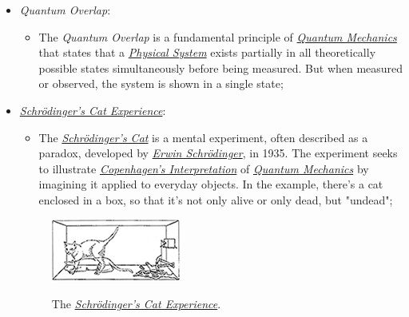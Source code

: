 \documentclass[conference]{IEEEtran}
\begin{document}
\begin{itemize}
  \item \textit{Quantum Overlap}:
    \begin{itemize}
        \item The \textit{Quantum Overlap} is a fundamental principle of \href{https://en.wikipedia.org/wiki/Quantum_mechanics}{\textit{Quantum Mechanics}} that states that a \href{https://en.wikipedia.org/wiki/Physical_system}{\textit{Physical System}} exists partially in all theoretically possible states simultaneously before being measured. But when measured or observed, the system is shown in a single state;
    \end{itemize}
  
  \newpage
  
  \item \href{https://en.wikipedia.org/wiki/Schr\%C3\%B6dinger\%27s_cat}{\textit{Schr\"odinger's Cat Experience}}:
    \begin{itemize}
        \item The \href{https://en.wikipedia.org/wiki/Schr\%C3\%B6dinger\%27s_cat}{\textit{Schr\"odinger's Cat}} is a mental experiment, often described as a paradox, developed by \href{https://en.wikipedia.org/wiki/Erwin_Schr\%C3\%B6dinger}{\textit{Erwin Schr\"odinger}}, in 1935. The experiment seeks to illustrate \href{https://en.wikipedia.org/wiki/Copenhagen_interpretation}{\textit{Copenhagen's Interpretation}} of \href{https://en.wikipedia.org/wiki/Quantum_mechanics}{\textit{Quantum Mechanics}} by imagining it applied to everyday objects. In the example, there's a cat enclosed in a box, so that it's not only alive or only dead, but "undead";
    \end{itemize}
  \begin{center}
      \begin{figure}[htbp]
        \centerline{\href{https://en.wikipedia.org/wiki/Schr\%C3\%B6dinger\%27s_cat}{\includegraphics{imgs/fig-3.png}}}
        \caption{The \href{https://en.wikipedia.org/wiki/Schr\%C3\%B6dinger\%27s_cat}{\textit{Schr\"odinger's Cat Experience}}.}
        \label{fig}
      \end{figure}
  \end{center}
 
 \vspace{4pt}
 

\end{itemize}
\end{document}
